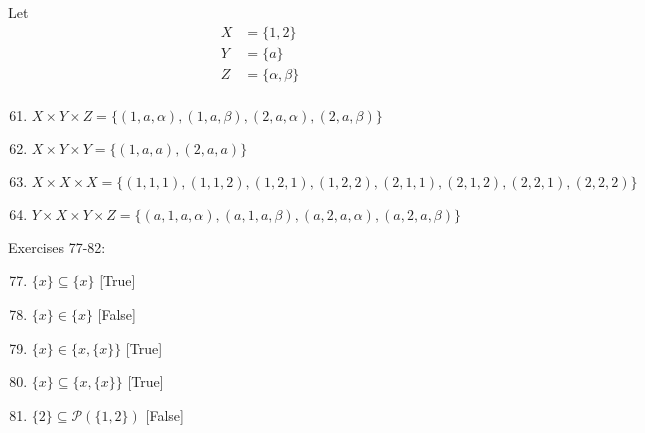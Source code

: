 Let 
\begin{align*}
    X &= \{1, 2\}\\
    Y &= \{a\}\\
    Z &= \{\alpha, \beta\}\\
\end{align*}

\begin{enumerate}
    \setcounter{enumi}{60}
    \item $X \times Y \times Z = \{(1, a, \alpha), (1, a, \beta), (2, a, \alpha), (2, a, \beta)\}$
    \item $X \times Y \times Y = \{(1, a, a), (2, a, a)\}$
    \item $X \times X \times X = \{(1, 1, 1), (1, 1, 2), (1, 2, 1), (1, 2, 2), (2, 1, 1), (2, 1, 2), (2, 2, 1), (2, 2, 2)\}$
    \item $Y \times X \times Y \times Z = \{(a, 1, a, \alpha), (a, 1, a, \beta), (a, 2, a, \alpha), (a, 2, a, \beta)\}$
\end{enumerate}

Exercises 77-82:
\begin{multicols}{2}
    \begin{enumerate}
        \setcounter{enumi}{76}
        \item $\{x\} \subseteq \{x\}$ [True]
        \item $\{x\} \in \{x\}$ [False]
        \item $\{x\} \in \{x, \{x\}\}$ [True]
        \item $\{x\} \subseteq \{x, \{x\}\}$ [True]       
        \item $\{2\} \subseteq \mathcal{P}(\{1, 2\})$ [False]
    \end{enumerate}
\end{multicols}






